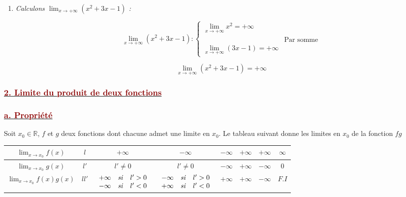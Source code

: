 \documentclass[12pt,a4paper]{article}
\begin{document}
\begin{enumerate}
    \[
    \boxed{\lim_{x \to -\infty} (2x^2 - x) = +\infty}
    \]

    \vspace{0.4cm}

    \item \textit{Calculons $\displaystyle \lim_{x \to +\infty} (x^2 + 3x - 1)$ :}
    
    \vspace{0.2cm}
    
    \[
    \lim_{x \to +\infty} (x^2 + 3x - 1) :
    \begin{cases}
    \displaystyle \lim_{x \to +\infty} x^2 = +\infty \\
    & \text{Par somme} \\
    \displaystyle \lim_{x \to +\infty} (3x - 1) = +\infty
    \end{cases}
    \]
    
    \[
    \boxed{\lim_{x \to +\infty} (x^2 + 3x - 1) = +\infty}
    \]
\end{enumerate}

\subsubsection*{\underline{\textcolor{darkred}{ 2. Limite du produit de deux fonctions }}}
\subsubsection*{\underline{\textcolor{darkred}{ a. Propriété }}}

Soit $x_0 \in \mathbb{R}$, $f$ et $g$ deux fonctions dont chacune admet une limite en $x_0$. Le tableau suivant donne les limites en $x_0$ de la fonction $fg$

\vspace{0.4cm}

\centering
\renewcommand{\arraystretch}{1.5}
\begin{tabular}{|c|c|c|c|c|c|c|c|}
    \hline
    $\displaystyle \lim_{x \to x_0} f(x)$ & $l$ & $+\infty$ & $-\infty$ & $-\infty$ & $+\infty$ & $+\infty$ & $\infty$ \\
    \hline
    $\displaystyle \lim_{x \to x_0} g(x)$ & $l'$ & $l' \neq 0$ & $l' \neq 0$ & $-\infty$ & $+\infty$ & $-\infty$ & $0$ \\
    \hline
    $\displaystyle \lim_{x \to x_0} f(x)g(x)$ & $ll'$ & 
    $\begin{array}{ccc} +\infty & \text{\textit{si}} & l' > 0 \\ -\infty & \text{\textit{si}} & l' < 0 \end{array}$ & 
    $\begin{array}{ccc} -\infty & \text{\textit{si}} & l' > 0 \\ +\infty & \text{\textit{si}} & l' < 0 \end{array}$ & 
    $+\infty$ & $+\infty$ & $-\infty$ & $F.I$ \\
    \hline
\end{tabular}
\end{document}
